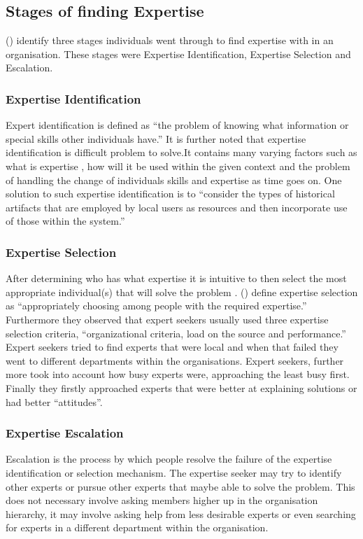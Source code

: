 \documentclass[a4paper,oneside,11pt]{report}
\begin{document}
\subsection{Stages of finding Expertise}	
\citeauthor{mcdonalackerman1998}(\citeyear{mcdonalackerman1998}) identify three stages individuals went through to find expertise with in an organisation. These stages were Expertise Identification, Expertise Selection and Escalation.  
\subsubsection{Expertise Identification} 
Expert identification is defined as \enquote {the problem of knowing what information or special skills other individuals have.} It is further noted that expertise identification is difficult problem to solve.It contains many varying factors such as what is expertise , how will it be used within the given context and the problem of handling the change of individuals skills and expertise as time goes on. One solution to such expertise identification is to \enquote {consider the types of historical artifacts that are employed by local users as resources and then incorporate use of those within the system.}\autocite{mcdonalackerman1998}
\subsubsection{Expertise Selection} 
After determining who has what expertise it is intuitive to then select the most appropriate individual(s) that will solve the problem \citeauthor{mcdonalackerman1998}. (\citeyear{mcdonalackerman1998}) define expertise selection as \enquote {appropriately choosing among people with the required expertise.} Furthermore they observed that expert seekers usually used three expertise selection criteria, \enquote {organizational criteria, load on the source and performance.} Expert seekers tried to find experts that were local and when that failed they went to different departments within the organisations. Expert seekers, further more took into account how busy experts were, approaching the least busy first. Finally they firstly approached experts that were better at explaining solutions or had better \enquote {attitudes}.

\subsubsection{Expertise Escalation} 
Escalation is the process by which people resolve the failure of the expertise identification or selection mechanism. The expertise seeker may try to identify other experts or pursue other experts that maybe able to solve the problem.  This does not necessary involve asking members higher up in the organisation hierarchy, it may involve asking help from less desirable experts or even searching for experts in a different department within the organisation\autocite{mcdonalackerman1998}.
\end{document}
